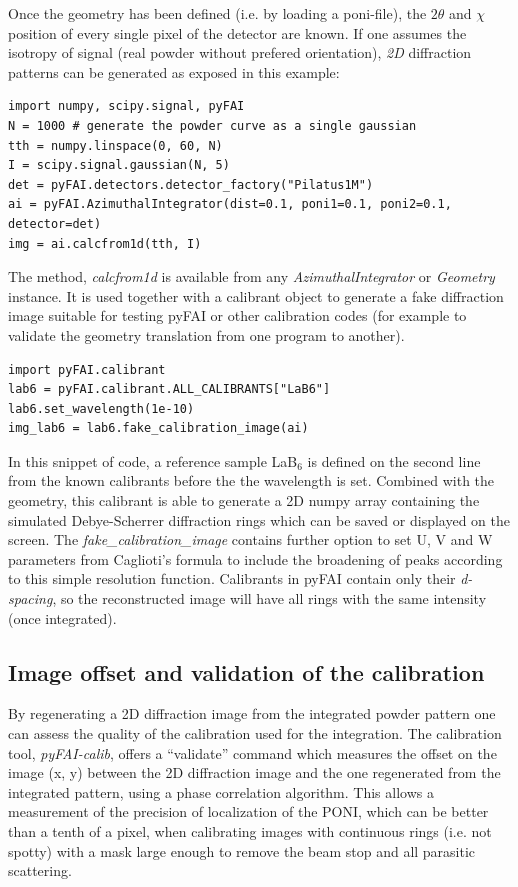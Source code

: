 \documentclass[preprint]{iucr}
\begin{document}
Once the geometry has been defined (i.e. by loading a poni-file), the $2\theta$ and
$\chi$ position of every single pixel of the detector are known.
If one assumes the isotropy of signal (real powder without prefered
orientation), \textit{2D} diffraction patterns can be generated as exposed in this
example:

\begin{verbatim}
import numpy, scipy.signal, pyFAI
N = 1000 # generate the powder curve as a single gaussian
tth = numpy.linspace(0, 60, N)
I = scipy.signal.gaussian(N, 5)
det = pyFAI.detectors.detector_factory("Pilatus1M")
ai = pyFAI.AzimuthalIntegrator(dist=0.1, poni1=0.1, poni2=0.1, detector=det)
img = ai.calcfrom1d(tth, I)
\end{verbatim}


The method, \textit{calcfrom1d} is available from any
\textit{AzimuthalIntegrator} or \textit{Geometry} instance.
It is used together with a calibrant object to generate a fake diffraction image
suitable for testing pyFAI or other calibration codes (for example to validate
the geometry translation from one program to another).


\begin{verbatim}
import pyFAI.calibrant
lab6 = pyFAI.calibrant.ALL_CALIBRANTS["LaB6"]
lab6.set_wavelength(1e-10)
img_lab6 = lab6.fake_calibration_image(ai)
\end{verbatim}

In this snippet of code, a reference sample LaB$_6$ is defined on the second
line from the known calibrants before the the wavelength is set.
Combined with the geometry, this calibrant is able to
generate a 2D numpy array containing the simulated Debye-Scherrer diffraction
rings which can be saved or displayed on the screen.
The \textit{fake\_calibration\_image} contains further option to set U, V and W
parameters from Caglioti's formula \cite{caglioti} to include the
broadening of peaks according to this simple resolution function.
Calibrants in pyFAI contain only their \textit{d-spacing}, so the
reconstructed image will have all rings with the same
intensity (once integrated).

\subsection{Image offset and validation of the calibration}
By regenerating a 2D diffraction image from the integrated powder pattern one
can assess the quality of the calibration used for the integration.
The calibration tool, \textit{pyFAI-calib}, offers  a ``validate'' command which
measures the offset on the image (x, y) between the 2D diffraction image and the
one regenerated from the integrated pattern, using a phase correlation
algorithm.
This allows a measurement of the precision of localization of the PONI, which
can be better than a tenth of a pixel, when calibrating images with continuous
rings (i.e. not spotty) with a mask large enough to remove the beam stop and
all parasitic scattering.
\end{document}
